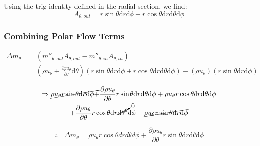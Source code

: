 \documentclass[12pt, letterpaper, twoside]{article}
\begin{document}
            Using the trig identity defined in the radial section, we find:
            \begin{equation}\label{eq:Athetaout_final}
                A_{\theta,out} = r\sin\theta \textrm{d}r \textrm{d}\phi + r\cos\theta \textrm{d}r \textrm{d}\theta \textrm{d}\phi
            \end{equation}

        \subsubsection{Combining Polar Flow Terms}
            \begin{equation*}
            \begin{split}
                \Delta\dot{m}_{\theta} & = (\dot{m}''_{\theta,out} A_{\theta,out} - \dot{m}''_{\theta,in} A_{\theta,in}) \\
                & = \left( \rho u_{\theta}  + \frac{\partial \rho u_{\theta}}{\partial \theta} \textrm{d}\theta \right) 
               \left(r\sin\theta \textrm{d}r \textrm{d}\phi + r\cos\theta \textrm{d}r \textrm{d}\theta \textrm{d}\phi\right) - 
               \left(\rho u_{\theta}\right) \left(r\sin\theta \textrm{d}r \textrm{d}\phi\right)
            \end{split}
            \end{equation*}

            \begin{multline*}
                \Rightarrow
                \cancel{\rho u_{\theta}r\sin\theta \textrm{d}r \textrm{d}\phi +} 
                \frac{\partial\rho u_{\theta}}{\partial\theta} r\sin\theta \textrm{d}r \textrm{d}\theta \textrm{d}\phi +
                \rho u_{\theta} r\cos\theta \textrm{d}r \textrm{d}\theta \textrm{d}\phi \\ + 
                \frac{\partial\rho u_{\theta}}{\partial\theta} r\cos\theta \textrm{d}r \cancelto{0}{\textrm{d}\theta^2} \textrm{d}\phi -
                \cancel{\rho u_{\theta}r\sin\theta \textrm{d}r \textrm{d}\phi}
            \end{multline*}

            \begin{equation}\label{eq:mdottheta}
                \therefore \quad \boxed{\Delta\dot{m}_{\theta} = 
                \rho u_{\theta} r\cos\theta dr d\theta d\phi + 
                \frac{\partial\rho u_{\theta}}{\partial\theta} r\sin\theta \textrm{d}r \textrm{d}\theta \textrm{d}\phi}
            \end{equation}
        
\end{document}
